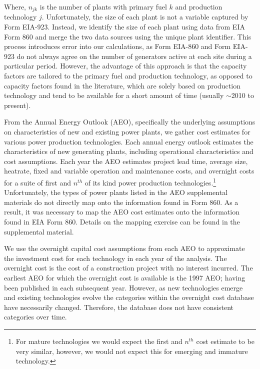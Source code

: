 \documentclass[10pt]{amsart}
\begin{document}
Where, $n_{jk}$ is the number of plants with primary fuel $k$ and production technology $j$.
Unfortunately, the size of each plant is not a variable captured by Form EIA-923.
Instead, we identify the size of each plant using data from EIA Form 860 and merge the two data sources using the unique plant identifier.
This process introduces error into our calculations, as Form EIA-860 and Form EIA-923 do not always agree on the number of generators active at each site during a particular period. 
However, the advantage of this approach is that the capacity factors are tailored to the primary fuel and production technology, as opposed to capacity factors found in the literature, which are solely based on production technology and tend to be available for a short amount of time (usually $\sim$2010 to present).

From the Annual Energy Outlook (AEO), specifically the underlying assumptions on characteristics of new and existing power plants, we gather cost estimates for various power production technologies. 
Each annual energy outlook estimates the characteristics of new generating plants, including operational characteristics and cost assumptions.
Each year the AEO estimates project lead time, average size, heatrate, fixed and variable operation and maintenance costs, and overnight costs for a suite of first and $n^{th}$ of its kind power production technologies.\footnote{For mature technologies we would expect the first and $n^{th}$ cost estimate to be very similar, however, we would not expect this for emerging and immature technology.}
Unfortunately, the types of power plants listed in the AEO supplemental materials do not directly map onto the information found in Form 860.
As a result, it was necessary to map the AEO cost estimates onto the information found in EIA Form 860.
Details on the mapping exercise can be found in the supplemental material.
 
We use the overnight capital cost assumptions from each AEO to approximate the investment cost for each technology in each year of the analysis.
The overnight cost is the cost of a construction project with no interest incurred.
The earliest AEO for which the overnight cost is available is the 1997 AEO; having been published in each subsequent year.
However, as new technologies emerge and existing technologies evolve the categories within the overnight cost database have necessarily changed. 
Therefore, the database does not have consistent categories over time.
\end{document}
